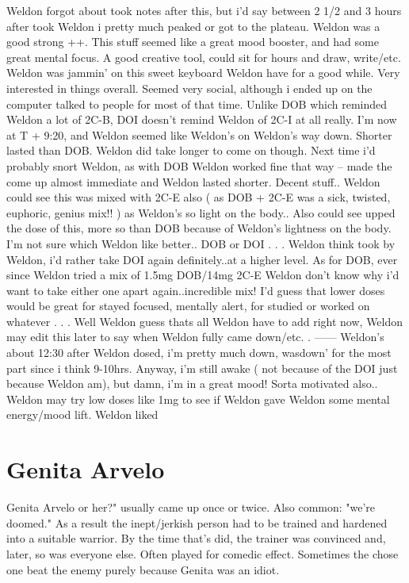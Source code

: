\documentclass[12pt]{book}
\begin{document}
Weldon forgot about took notes after this, but i'd say between 2 1/2 and 3 hours after took Weldon i pretty much peaked or got to the plateau. Weldon was a good strong ++. This stuff seemed like a great mood booster, and had some great mental focus. A good creative tool, could sit for hours and draw, write/etc. Weldon was jammin' on this sweet keyboard Weldon have for a good while. Very interested in things overall. Seemed very social, although i ended up on the computer talked to people for most of that time. Unlike DOB which reminded Weldon a lot of 2C-B, DOI doesn't remind Weldon of 2C-I at all really. I'm now at T + 9:20, and Weldon seemed like Weldon's on Weldon's way down. Shorter lasted than DOB. Weldon did take longer to come on though. Next time i'd probably snort Weldon, as with DOB Weldon worked fine that way -- made the come up almost immediate and Weldon lasted shorter. Decent stuff.. Weldon could see this was mixed with 2C-E also ( as DOB + 2C-E was a sick, twisted, euphoric, genius mix!! ) as Weldon's so light on the body.. Also could see upped the dose of this, more so than DOB because of Weldon's lightness on the body. I'm not sure which Weldon like better.. DOB or DOI . . .  Weldon think took by Weldon, i'd rather take DOI again definitely..at a higher level. As for DOB, ever since Weldon tried a mix of 1.5mg DOB/14mg 2C-E Weldon don't know why i'd want to take either one apart again..incredible mix! I'd guess that lower doses would be great for stayed focused, mentally alert, for studied or worked on whatever . . .  Well Weldon guess thats all Weldon have to add right now, Weldon may edit this later to say when Weldon fully came down/etc. . ------ Weldon's about 12:30 after Weldon dosed, i'm pretty much down, wasdown' for the most part since i think 9-10hrs. Anyway, i'm still awake ( not because of the DOI just because Weldon am), but damn, i'm in a great mood! Sorta motivated also.. Weldon may try low doses like 1mg to see if Weldon gave Weldon some mental energy/mood lift. Weldon liked



\chapter{Genita Arvelo}

Genita Arvelo or her?" usually came up once or twice. Also common: "we're doomed." As a result the inept/jerkish person had to be trained and hardened into a suitable warrior. By the time that's did, the trainer was convinced and, later, so was everyone else. Often played for comedic effect. Sometimes the chose one beat the enemy purely because Genita was an idiot.
\end{document}
